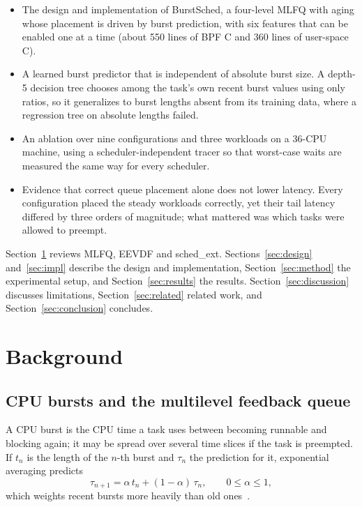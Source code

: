 \documentclass[conference]{IEEEtran}
\begin{document}
\begin{itemize}
\item The design and implementation of BurstSched, a four-level MLFQ with aging whose placement
is driven by burst prediction, with six features that can be enabled one at a time
(about 550 lines of BPF C and 360 lines of user-space C).
\item A learned burst predictor that is independent of absolute burst size. A depth-5 decision
tree chooses among the task's own recent burst values using only ratios, so it generalizes to
burst lengths absent from its training data, where a regression tree on absolute lengths failed.
\item An ablation over nine configurations and three workloads on a 36-CPU machine, using a
scheduler-independent tracer so that worst-case waits are measured the same way for every
scheduler.
\item Evidence that correct queue placement alone does not lower latency. Every configuration
placed the steady workloads correctly, yet their tail latency differed by three orders of
magnitude; what mattered was which tasks were allowed to preempt.
\end{itemize}

Section~\ref{sec:background} reviews MLFQ, EEVDF and sched\_ext. Sections~\ref{sec:design}
and~\ref{sec:impl} describe the design and implementation, Section~\ref{sec:method} the
experimental setup, and Section~\ref{sec:results} the results. Section~\ref{sec:discussion}
discusses limitations, Section~\ref{sec:related} related work, and Section~\ref{sec:conclusion}
concludes.

\section{Background}\label{sec:background}

\subsection{CPU bursts and the multilevel feedback queue}

A CPU burst is the CPU time a task uses between becoming runnable and blocking again; it may be
spread over several time slices if the task is preempted. If $t_n$ is the length of the $n$-th
burst and $\tau_n$ the prediction for it, exponential averaging predicts
\begin{equation}
\tau_{n+1} = \alpha\, t_n + (1-\alpha)\,\tau_n, \qquad 0 \le \alpha \le 1,
\label{eq:ewma}
\end{equation}
which weights recent bursts more heavily than old ones~\cite{silberschatz}.
\end{document}

